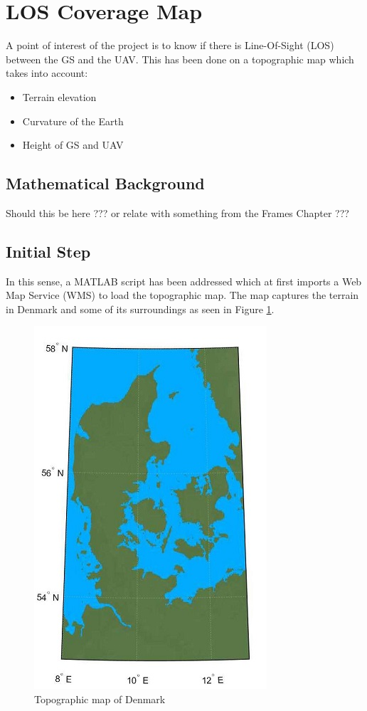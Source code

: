 \section{LOS Coverage Map}\label{sec:los_map}
A point of interest of the project is to know if there is Line-Of-Sight (LOS) between the GS and the UAV. This has been done on a topographic map which takes into account:

\begin{itemize}
	\item Terrain elevation
	\item Curvature of the Earth
	\item Height of GS and UAV
\end{itemize}

\subsection{Mathematical Background}
Should this be here ??? or relate with something from the Frames Chapter ???

\subsection{Initial Step}
In this sense, a MATLAB script has been addressed which at first imports a Web Map Service (WMS) to load the topographic map. The map captures the terrain in Denmark and some of its surroundings as seen in Figure \ref{fig:dk_map}.

\begin{figure}[h]
	\centering
	\includegraphics[scale=2]{figures/denmark.jpg}
	\caption{Topographic map of Denmark}
   	\label{fig:dk_map}
\end{figure}

